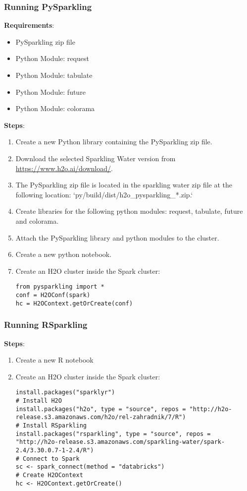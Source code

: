 \subsubsection{Running PySparkling}

\textbf{Requirements}:
\begin{itemize}
\item PySparkling zip file
\item Python Module: request
\item Python Module: tabulate
\item Python Module: future
\item Python Module: colorama
\end{itemize}

\textbf{Steps}:
\begin{enumerate}
\item Create a new Python library containing the PySparkling zip file.
\item Download the selected Sparkling Water version from \url{https://www.h2o.ai/download/}.
\item The PySparkling zip file is located in the sparkling water zip file at the following location: `py/build/dist/h2o\_pysparkling\_*.zip.`
\item Create libraries for the following python modules: request, tabulate, future and colorama.
\item Attach the PySparkling library and python modules to the cluster.
\item Create a new python notebook.
\item Create an H2O cluster inside the Spark cluster:
\begin{lstlisting}[style=Python]
from pysparkling import *
conf = H2OConf(spark)
hc = H2OContext.getOrCreate(conf)
\end{lstlisting}

\end{enumerate}

\subsubsection{Running RSparkling}

\textbf{Steps}:
\begin{enumerate}
  \item Create a new R notebook
  \item Create an H2O cluster inside the Spark cluster:
  \begin{lstlisting}[style=R]
install.packages("sparklyr")
# Install H2O
install.packages("h2o", type = "source", repos = "http://h2o-release.s3.amazonaws.com/h2o/rel-zahradnik/7/R")
# Install RSparkling
install.packages("rsparkling", type = "source", repos = "http://h2o-release.s3.amazonaws.com/sparkling-water/spark-2.4/3.30.0.7-1-2.4/R")
# Connect to Spark
sc <- spark_connect(method = "databricks")
# Create H2OContext
hc <- H2OContext.getOrCreate()
  \end{lstlisting}

\end{enumerate}